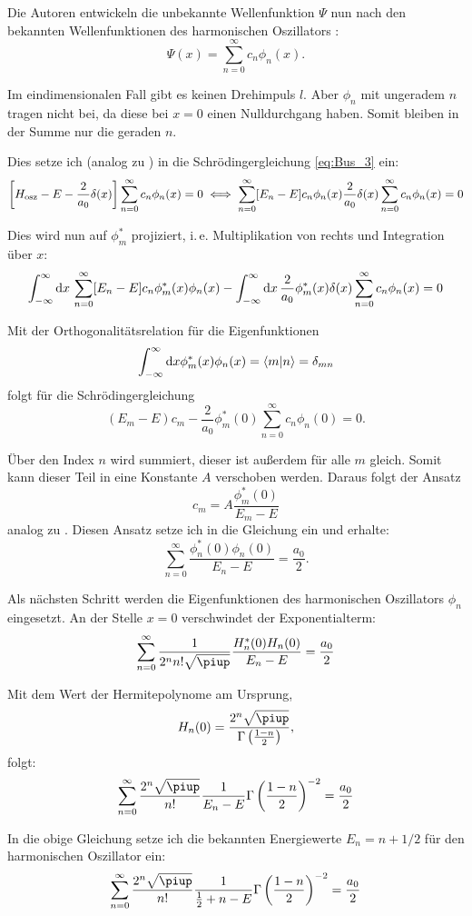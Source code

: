 Die Autoren entwickeln die unbekannte Wellenfunktion $\Psi$ nun nach den
bekannten Wellenfunktionen des harmonischen Oszillators :
\[
    \Psi(x) = \sum_{n=0}^\infty c_n \phi_n(x).
\]

Im eindimensionalen Fall gibt es keinen Drehimpuls $l$. Aber $\phi_n$ mit
ungeradem $n$ tragen nicht bei, da diese bei $x = 0$ einen Nulldurchgang haben.
Somit bleiben in der Summe nur die geraden $n$.

Dies setze ich (analog zu ) in die Schrödingergleichung \eqref{eq:Bus_3}
ein:
\[
    \sbr{H_\text{osz} - E - \frac2{a_0} \delta(x)}
    \sum_{n=0}^\infty c_n \phi_n(x)
    = 0
    \iff
    \sum_{n=0}^\infty [E_n - E] c_n \phi_n(x)
    \frac2{a_0} \delta(x)
    \sum_{n=0}^\infty c_n \phi_n(x)
    = 0
\]

Dies wird nun auf $\phi_m^*$ projiziert, i.\,e. Multiplikation von rechts und
Integration über $x$:
\[
    \int_{-\infty}^\infty \dif x \, \sum_{n=0}^\infty
    [E_n - E] c_n \phi_m^*(x) \phi_n(x)
    -
    \int_{-\infty}^\infty \dif x \,  \frac2{a_0} \phi_m^*(x) \delta(x)
    \sum_{n=0}^\infty c_n \phi_n(x) = 0
\]

Mit der Orthogonalitätsrelation für die Eigenfunktionen
\[
    \int_{-\infty}^\infty \dif x \phi_m^*(x) \phi_n(x) = \braket{m|n} =
    \delta_{mn}
\]
folgt für die Schrödingergleichung
\[
    (E_m - E) c_m - \frac2{a_0} \phi_m^*(0) \sum_{n=0}^\infty c_n \phi_n(0) =
    0.
\]

Über den Index $n$ wird summiert, dieser ist außerdem für alle $m$ gleich.
Somit kann dieser Teil in eine Konstante $A$ verschoben werden. Daraus folgt
der Ansatz
\[
    c_m = A \frac{\phi_m^*(0)}{E_m - E}
\]
analog zu . Diesen Ansatz setze ich in die Gleichung ein und erhalte:
\[
    \sum_{n=0}^\infty \frac{\phi_n^*(0) \phi_n(0)}{E_n - E} = \frac{a_0}2.
\]

Als nächsten Schritt werden die Eigenfunktionen des harmonischen Oszillators
$\phi_n$ eingesetzt. An der Stelle $x = 0$ verschwindet der Exponentialterm:
\[
    \sum_{n=0}^\infty \frac{1}{2^n n! \sqrt\piup} \frac{H_n^*(0) H_n(0)}{E_n -
    E} = \frac{a_0}2
\]

Mit dem Wert der Hermitepolynome am Ursprung,
\[
    H_n(0) = \frac{2^n \sqrt\piup}{\Gamma\del{\frac{1-n}2}},
\]
folgt:
\[
    \sum_{n=0}^\infty \frac{2^n \sqrt\piup}{n!} \frac{1}{E_n -
    E} \Gamma\del{\frac{1-n}2}^{-2} = \frac{a_0}2
\]

In die obige Gleichung setze ich die bekannten Energiewerte $E_n = n + 1/2$ für
den harmonischen Oszillator ein:
\[
    \sum_{n=0}^\infty \frac{2^n \sqrt\piup}{n!} \frac{1}{\frac 12 + n -
    E} \Gamma\del{\frac{1-n}2}^{-2} = \frac{a_0}2
\]

